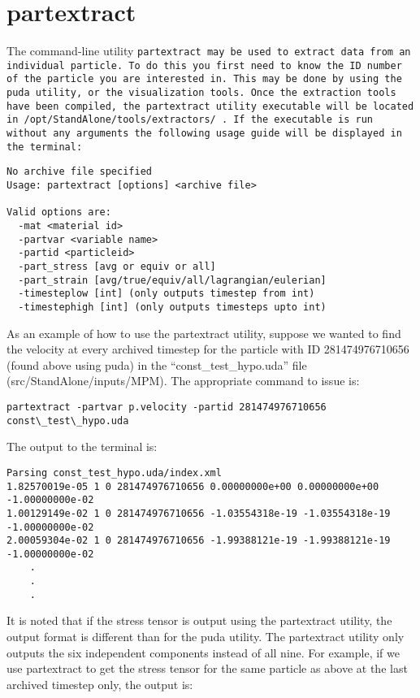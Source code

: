 \section{partextract}

The command-line utility \tt partextract \normalfont may be used to
extract data from an individual particle.  To do this you first need
to know the ID number of the particle you are interested in.  This may
be done by using the puda utility, or the visualization tools.  Once
the extraction tools have been compiled, the partextract utility
executable will be located in \tt /opt/StandAlone/tools/extractors/
\normalfont.  If the executable is run without any arguments the
following usage guide will be displayed in the terminal:

\begin{Verbatim}[fontsize=\footnotesize]
No archive file specified
Usage: partextract [options] <archive file>

Valid options are:
  -mat <material id>
  -partvar <variable name>
  -partid <particleid>
  -part_stress [avg or equiv or all]
  -part_strain [avg/true/equiv/all/lagrangian/eulerian]
  -timesteplow [int] (only outputs timestep from int)
  -timestephigh [int] (only outputs timesteps upto int)
\end{Verbatim}

As an example of how to use the partextract utility, suppose we wanted
to find the velocity at every archived timestep for the particle with
ID 281474976710656 (found above using puda) in the
``const\_test\_hypo.uda'' file (src/StandAlone/inputs/MPM).  The
appropriate command to issue is:

\begin{Verbatim}[fontsize=\footnotesize]
partextract -partvar p.velocity -partid 281474976710656 const\_test\_hypo.uda
\end{Verbatim}

The output to the terminal is:

\begin{Verbatim}[fontsize=\footnotesize]
Parsing const_test_hypo.uda/index.xml
1.82570019e-05 1 0 281474976710656 0.00000000e+00 0.00000000e+00 -1.00000000e-02
1.00129149e-02 1 0 281474976710656 -1.03554318e-19 -1.03554318e-19 -1.00000000e-02
2.00059304e-02 1 0 281474976710656 -1.99388121e-19 -1.99388121e-19 -1.00000000e-02
	.
	.
	.
\end{Verbatim}

It is noted that if the stress tensor is output using the partextract utility, the output format is different than for the puda utility.  The partextract utility only outputs the six independent components instead of all nine.  For example, if we use partextract to get the stress tensor for the same particle as above at the last archived timestep only, the output is:


